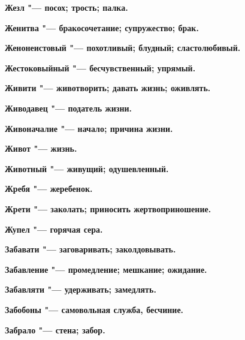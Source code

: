 \bfseries Жезл \normalfont{} "--- посох; трость; палка. 




\bfseries Женитва \normalfont{} "--- бракосочетание; супружество; брак. 




\bfseries Женонеистовый \normalfont{} "--- похотливый; блудный; сластолюбивый. 




\bfseries Жестоковыйный \normalfont{} "--- бесчувственный; упрямый. 




\bfseries Живити \normalfont{} "--- животворить; давать жизнь; оживлять. 




\bfseries Живодавец \normalfont{} "--- податель жизни. 




\bfseries Живоначалие \normalfont{} "--- начало; причина жизни. 




\bfseries Живот \normalfont{} "--- жизнь. 




\bfseries Животный \normalfont{} "--- живущий; одушевленный. 




\bfseries Жребя \normalfont{} "--- жеребенок. 




\bfseries Жрети \normalfont{} "--- заколать; приносить жертвоприношение. 




\bfseries Жупел \normalfont{} "--- горячая сера. 




 





\bfseries Забавати \normalfont{} "--- заговаривать; заколдовывать. 




\bfseries Забавление \normalfont{} "--- промедление; мешкание; ожидание. 




\bfseries Забавляти \normalfont{} "--- удерживать; замедлять. 




\bfseries Забобоны \normalfont{} "--- самовольная служба, бесчиние. 




\bfseries Забрало \normalfont{} "--- стена; забор. 





